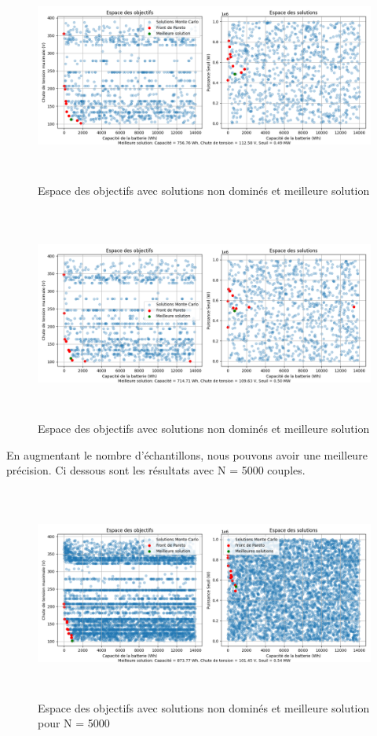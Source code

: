 \documentclass[11pt, a4paper, oneside, portrait]{report}
\begin{document}
            \begin{figure}[H]
                \centering
                \includegraphics[height=7cm]{Monte-Carlo(1).png}
                \caption{Espace des objectifs avec solutions non dominés et meilleure solution}
            \end{figure}

            \begin{figure}[H]
                \centering
                \includegraphics[height=7cm]{Monte-Carlo(2).png}
                \caption{Espace des objectifs avec solutions non dominés et meilleure solution}
            \end{figure}

            En augmentant le nombre d'échantillons, nous pouvons avoir une meilleure précision. Ci dessous sont les résultats avec N = 5000 couples. 

            \begin{figure}[H]
                \centering
                \includegraphics[height=7cm]{Monte-Carlo_5000.png}
                \caption{Espace des objectifs avec solutions non dominés et meilleure solution pour N = 5000}
            \end{figure}
\end{document}
